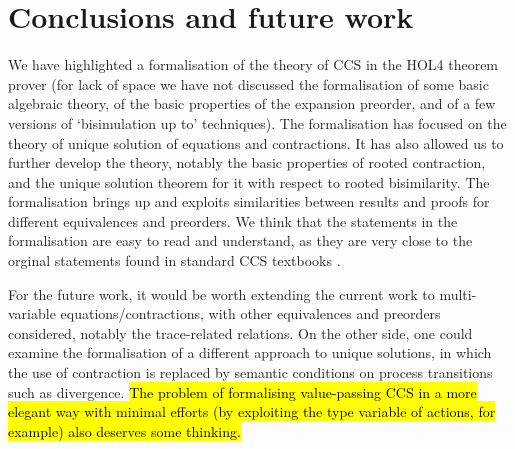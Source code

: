


\section{Conclusions and future work}
\label{s:concl}

We have highlighted a formalisation of the theory of CCS in the 
HOL4 theorem prover (for lack of space we have not discussed 
the formalisation of some basic algebraic theory, of the basic
properties of the expansion preorder,   and of a few
 versions of `bisimulation up to'
techniques). %
The formalisation has focused on the theory of
unique solution of equations and contractions. 
It has also allowed us to further develop the theory,
notably the basic properties of rooted contraction, and the unique
solution theorem for it with respect to rooted bisimilarity. 
The formalisation brings up and exploits similarities between results
and proofs for different equivalences and preorders. 
We think that the statements in the formalisation are easy to read and
understand, as they are very close to the orginal statements found in
standard CCS textbooks \cite{Gorrieri:2015jt,Mil89}.

For the future work, it would be worth extending the current work
to multi-variable equations/contractions, with other equivalences
and preorders considered, notably the trace-related relations.
On the other side, one could examine the formalisation of a different
approach \cite{DurierHS17} to unique
solutions, in which the use of contraction is
replaced by semantic conditions on process transitions such as
divergence. \hl{The problem of formalising value-passing CCS in a
more elegant way with minimal efforts (by exploiting the type variable
of actions, for example) also deserves some thinking.}

